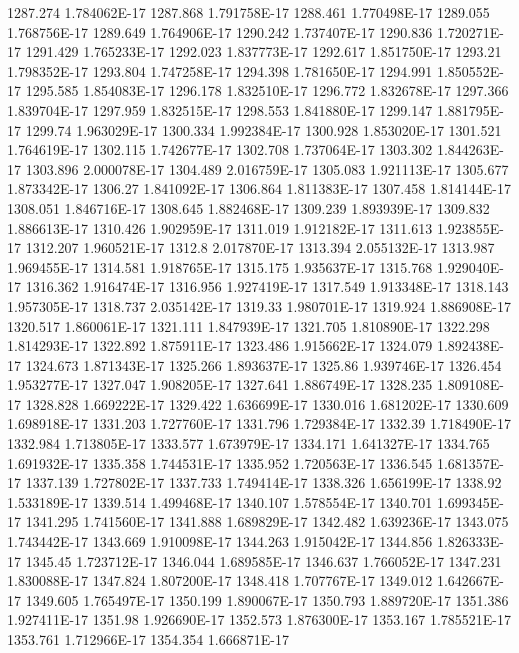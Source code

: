 1287.274  1.784062E-17
1287.868  1.791758E-17
1288.461  1.770498E-17
1289.055  1.768756E-17
1289.649  1.764906E-17
1290.242  1.737407E-17
1290.836  1.720271E-17
1291.429  1.765233E-17
1292.023  1.837773E-17
1292.617  1.851750E-17
1293.21  1.798352E-17
1293.804  1.747258E-17
1294.398  1.781650E-17
1294.991  1.850552E-17
1295.585  1.854083E-17
1296.178  1.832510E-17
1296.772  1.832678E-17
1297.366  1.839704E-17
1297.959  1.832515E-17
1298.553  1.841880E-17
1299.147  1.881795E-17
1299.74  1.963029E-17
1300.334  1.992384E-17
1300.928  1.853020E-17
1301.521  1.764619E-17
1302.115  1.742677E-17
1302.708  1.737064E-17
1303.302  1.844263E-17
1303.896  2.000078E-17
1304.489  2.016759E-17
1305.083  1.921113E-17
1305.677  1.873342E-17
1306.27  1.841092E-17
1306.864  1.811383E-17
1307.458  1.814144E-17
1308.051  1.846716E-17
1308.645  1.882468E-17
1309.239  1.893939E-17
1309.832  1.886613E-17
1310.426  1.902959E-17
1311.019  1.912182E-17
1311.613  1.923855E-17
1312.207  1.960521E-17
1312.8  2.017870E-17
1313.394  2.055132E-17
1313.987  1.969455E-17
1314.581  1.918765E-17
1315.175  1.935637E-17
1315.768  1.929040E-17
1316.362  1.916474E-17
1316.956  1.927419E-17
1317.549  1.913348E-17
1318.143  1.957305E-17
1318.737  2.035142E-17
1319.33  1.980701E-17
1319.924  1.886908E-17
1320.517  1.860061E-17
1321.111  1.847939E-17
1321.705  1.810890E-17
1322.298  1.814293E-17
1322.892  1.875911E-17
1323.486  1.915662E-17
1324.079  1.892438E-17
1324.673  1.871343E-17
1325.266  1.893637E-17
1325.86  1.939746E-17
1326.454  1.953277E-17
1327.047  1.908205E-17
1327.641  1.886749E-17
1328.235  1.809108E-17
1328.828  1.669222E-17
1329.422  1.636699E-17
1330.016  1.681202E-17
1330.609  1.698918E-17
1331.203  1.727760E-17
1331.796  1.729384E-17
1332.39  1.718490E-17
1332.984  1.713805E-17
1333.577  1.673979E-17
1334.171  1.641327E-17
1334.765  1.691932E-17
1335.358  1.744531E-17
1335.952  1.720563E-17
1336.545  1.681357E-17
1337.139  1.727802E-17
1337.733  1.749414E-17
1338.326  1.656199E-17
1338.92  1.533189E-17
1339.514  1.499468E-17
1340.107  1.578554E-17
1340.701  1.699345E-17
1341.295  1.741560E-17
1341.888  1.689829E-17
1342.482  1.639236E-17
1343.075  1.743442E-17
1343.669  1.910098E-17
1344.263  1.915042E-17
1344.856  1.826333E-17
1345.45  1.723712E-17
1346.044  1.689585E-17
1346.637  1.766052E-17
1347.231  1.830088E-17
1347.824  1.807200E-17
1348.418  1.707767E-17
1349.012  1.642667E-17
1349.605  1.765497E-17
1350.199  1.890067E-17
1350.793  1.889720E-17
1351.386  1.927411E-17
1351.98  1.926690E-17
1352.573  1.876300E-17
1353.167  1.785521E-17
1353.761  1.712966E-17
1354.354  1.666871E-17
